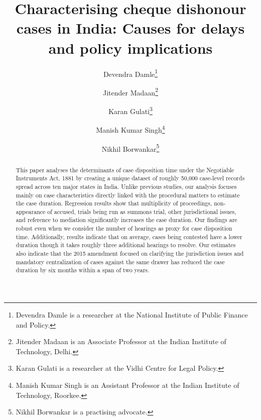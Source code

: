 \documentclass[12pt,a4paper]{article}
\title{Characterising cheque dishonour cases in India: Causes for delays and policy implications}
\author{Devendra Damle\thanks{Devendra Damle is a researcher at the National Institute of Public Finance and Policy.} \and Jitender Madaan\thanks{Jitender Madaan is an Associate Professor at the Indian Institute of Technology, Delhi.} \and Karan Gulati\thanks{Karan Gulati is a researcher at the Vidhi Centre for Legal Policy.} \and Manish Kumar Singh\thanks{Manish Kumar Singh is an Assistant Professor at the Indian Institute of Technology, Roorkee.} \and Nikhil Borwankar\thanks{Nikhil Borwankar is a practising advocate.}}
\begin{document}
	\maketitle
	
	\begin{abstract}
		
		This paper analyses the determinants of case disposition time under the Negotiable Instruments Act, 1881 by creating a unique dataset of roughly 50,000 case-level records spread across ten major states in India. Unlike previous studies, our analysis focuses mainly on case characteristics directly linked with the procedural matters to estimate the case duration. Regression results show that multiplicity of proceedings, non-appearance of accused, trials being run as summons trial, other jurisdictional issues, and reference to mediation significantly increases the case duration. Our findings are robust even when we consider the number of hearings as proxy for case disposition time. Additionally, results indicate that on average, cases being contested have a lower duration though it takes roughly three additional hearings to resolve. Our estimates also indicate that the 2015 amendment focused on clarifying the jurisdiction issues and mandatory centralization of cases against the same drawer has reduced the case duration by six months within a span of two years.
		
		
		
		
		
	\end{abstract}
	
\end{document}
